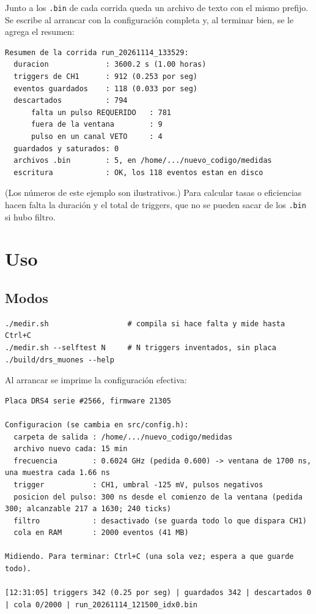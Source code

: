 \documentclass[11pt,a4paper]{article}
\newcommand{\code}[1]{\texttt{#1}}
\begin{document}
Junto a los \code{.bin} de cada corrida queda un archivo de texto con el mismo
prefijo. Se escribe al arrancar con la configuración completa y, al terminar bien,
se le agrega el resumen:

\begin{lstlisting}[style=shell]
Resumen de la corrida run_20261114_133529:
  duracion             : 3600.2 s (1.00 horas)
  triggers de CH1      : 912 (0.253 por seg)
  eventos guardados    : 118 (0.033 por seg)
  descartados          : 794
      falta un pulso REQUERIDO   : 781
      fuera de la ventana        : 9
      pulso en un canal VETO     : 4
  guardados y saturados: 0
  archivos .bin        : 5, en /home/.../nuevo_codigo/medidas
  escritura            : OK, los 118 eventos estan en disco
\end{lstlisting}

(Los números de este ejemplo son ilustrativos.) Para calcular tasas o eficiencias
hacen falta la duración y el total de triggers, que no se pueden sacar de los
\code{.bin} si hubo filtro.

\section{Uso}

\subsection{Modos}

\begin{lstlisting}[style=shell]
./medir.sh                  # compila si hace falta y mide hasta Ctrl+C
./medir.sh --selftest N     # N triggers inventados, sin placa
./build/drs_muones --help
\end{lstlisting}

Al arrancar se imprime la configuración efectiva:

\begin{lstlisting}[style=shell]
Placa DRS4 serie #2566, firmware 21305

Configuracion (se cambia en src/config.h):
  carpeta de salida : /home/.../nuevo_codigo/medidas
  archivo nuevo cada: 15 min
  frecuencia        : 0.6024 GHz (pedida 0.600) -> ventana de 1700 ns, una muestra cada 1.66 ns
  trigger           : CH1, umbral -125 mV, pulsos negativos
  posicion del pulso: 300 ns desde el comienzo de la ventana (pedida 300; alcanzable 217 a 1630; 240 ticks)
  filtro            : desactivado (se guarda todo lo que dispara CH1)
  cola en RAM       : 2000 eventos (41 MB)

Midiendo. Para terminar: Ctrl+C (una sola vez; espera a que guarde todo).

[12:31:05] triggers 342 (0.25 por seg) | guardados 342 | descartados 0 | cola 0/2000 | run_20261114_121500_idx0.bin
\end{lstlisting}
\end{document}
